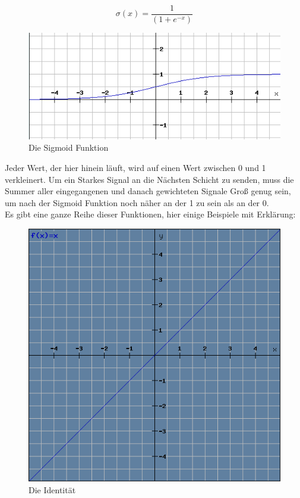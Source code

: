 \documentclass[12pt]{article}
\begin{document}
$$\sigma (x)=\frac{1}{(1+e^{-x})}$$
\begin{figure}[H]
\centering
\includegraphics[scale=0.70]{./Images/Pasted image 20230912192401.png}
\caption{Die Sigmoid Funktion}
\label{Was kommt hier rein?}\end{figure}
Jeder Wert, der hier hinein läuft, wird auf einen Wert zwischen 0 und 1 verkleinert. 
Um ein Starkes Signal an die Nächsten Schicht zu senden, muss die Summer aller eingegangenen und danach gewichteten Signale Groß genug sein, um nach der Sigmoid Funktion noch näher an der 1 zu sein als an der 0. 
\\Es gibt eine ganze Reihe dieser Funktionen, hier einige Beispiele mit Erklärung:
\begin{figure}[H]
\centering
\includegraphics[scale=0.5]{./Images/Pasted image 20230912194736.png}
\caption{Die Identität}
\label{Was kommt hier rein?}\end{figure}
\end{document}
